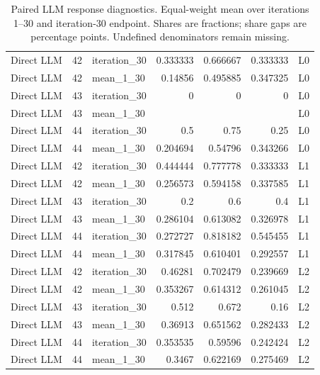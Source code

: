 \begin{table}[htbp!]
\begin{tabular}{lrlrrrl}
Direct LLM & 42 & iteration\_30 & 0.333333 & 0.666667 & 0.333333 & L0 \\
Direct LLM & 42 & mean\_1\_30 & 0.14856 & 0.495885 & 0.347325 & L0 \\
Direct LLM & 43 & iteration\_30 & 0 & 0 & 0 & L0 \\
Direct LLM & 43 & mean\_1\_30 & \textemdash{} & \textemdash{} & \textemdash{} & L0 \\
Direct LLM & 44 & iteration\_30 & 0.5 & 0.75 & 0.25 & L0 \\
Direct LLM & 44 & mean\_1\_30 & 0.204694 & 0.54796 & 0.343266 & L0 \\
Direct LLM & 42 & iteration\_30 & 0.444444 & 0.777778 & 0.333333 & L1 \\
Direct LLM & 42 & mean\_1\_30 & 0.256573 & 0.594158 & 0.337585 & L1 \\
Direct LLM & 43 & iteration\_30 & 0.2 & 0.6 & 0.4 & L1 \\
Direct LLM & 43 & mean\_1\_30 & 0.286104 & 0.613082 & 0.326978 & L1 \\
Direct LLM & 44 & iteration\_30 & 0.272727 & 0.818182 & 0.545455 & L1 \\
Direct LLM & 44 & mean\_1\_30 & 0.317845 & 0.610401 & 0.292557 & L1 \\
Direct LLM & 42 & iteration\_30 & 0.46281 & 0.702479 & 0.239669 & L2 \\
Direct LLM & 42 & mean\_1\_30 & 0.353267 & 0.614312 & 0.261045 & L2 \\
Direct LLM & 43 & iteration\_30 & 0.512 & 0.672 & 0.16 & L2 \\
Direct LLM & 43 & mean\_1\_30 & 0.36913 & 0.651562 & 0.282433 & L2 \\
Direct LLM & 44 & iteration\_30 & 0.353535 & 0.59596 & 0.242424 & L2 \\
Direct LLM & 44 & mean\_1\_30 & 0.3467 & 0.622169 & 0.275469 & L2 \\
\hline
\end{tabular}
\caption{Paired LLM response diagnostics. Equal-weight mean over iterations 1--30 and iteration-30 endpoint. Shares are fractions; share gaps are percentage points. Undefined denominators remain missing.}
\label{chap:results:tab:rq2_llm_common_subset_agreement}
\end{table}
